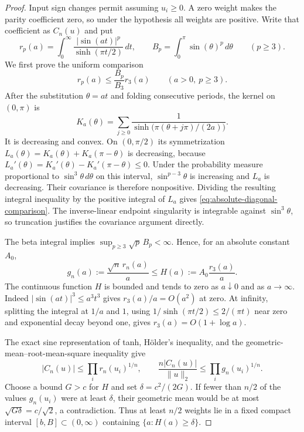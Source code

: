 \begin{proof}
Input sign changes permit assuming $u_i\ge0$. A zero weight makes the
parity coefficient zero, so under the hypothesis all weights are positive.
Write that coefficient as $C_n(u)$ and put
\[
 r_p(a)=\int_0^\infty\frac{|\sin(at)|^p}{\sinh(\pi t/2)}\,dt,
 \qquad B_p=\int_0^\pi\sin(\theta)^p\,d\theta\qquad(p\ge3).
\]
We first prove the uniform comparison
\begin{equation}\label{eq:absolute-diagonal-comparison}
 r_p(a)\le\frac{B_p}{B_3}r_3(a)\qquad(a>0,\ p\ge3).
\end{equation}
After the substitution $\theta=at$ and folding consecutive periods, the
kernel on $(0,\pi)$ is
\[
 K_a(\theta)=\sum_{j\ge0}
 \frac1{\sinh\bigl(\pi(\theta+j\pi)/(2a)\bigr)}.
\]
It is decreasing and convex. On $(0,\pi/2)$ its symmetrization
$L_a(\theta)=K_a(\theta)+K_a(\pi-\theta)$ is decreasing, because
$L_a'(\theta)=K_a'(\theta)-K_a'(\pi-\theta)\le0$.
Under the probability measure proportional to $\sin^3\theta\,d\theta$
on this interval, $\sin^{p-3}\theta$ is increasing and $L_a$ is
decreasing. Their covariance is therefore nonpositive. Dividing the
resulting integral inequality by the positive integral of $L_a$ gives
\eqref{eq:absolute-diagonal-comparison}. The inverse-linear endpoint
singularity is integrable against $\sin^3\theta$, so truncation justifies
the covariance argument directly.

The beta integral implies $\sup_{p\ge3}\sqrt p\,B_p<\infty$. Hence,
for an absolute constant $A_0$,
\[
 g_n(a):=\frac{\sqrt n\,r_n(a)}a
 \le H(a):=A_0\frac{r_3(a)}a.
\]
The continuous function $H$ is bounded and tends to zero as $a\downarrow0$
and as $a\to\infty$. Indeed $|\sin(at)|^3\le a^3t^3$ gives
$r_3(a)/a=O(a^2)$ at zero. At infinity, splitting the integral at $1/a$
and $1$, using $1/\sinh(\pi t/2)\le2/(\pi t)$ near zero and exponential
decay beyond one, gives $r_3(a)=O(1+\log a)$.

The exact sine representation of tanh, H\"older's inequality, and the
geometric-mean--root-mean-square inequality give
\[
 |C_n(u)|\le\prod_i r_n(u_i)^{1/n},\qquad
 \frac{n|C_n(u)|}{\|u\|_2}\le\prod_i g_n(u_i)^{1/n}.
\]
Choose a bound $G>c$ for $H$ and set $\delta=c^2/(2G)$. If fewer than
$n/2$ of the values $g_n(u_i)$ were at least $\delta$, their geometric
mean would be at most $\sqrt{G\delta}=c/\sqrt2$, a contradiction.
Thus at least $n/2$ weights lie in a fixed compact interval
$[b,B]\subset(0,\infty)$ containing $\{a:H(a)\ge\delta\}$.


\end{proof}
